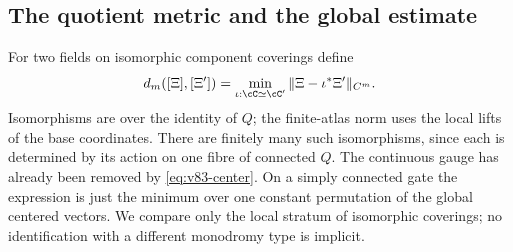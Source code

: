 \subsection{The quotient metric and the global estimate}
For two fields on isomorphic component coverings define
\begin{equation}\label{eq:v83-quotient-metric}
 d_m([\Xi],[\Xi'])=
       \min_{\iota:\cC\simeq\cC'}\|\Xi-\iota^*\Xi'\|_{C^m}.
\end{equation}
Isomorphisms are over the identity of $Q$; the finite-atlas norm uses
the local lifts of the base coordinates. There are finitely many such
isomorphisms, since each is determined by its action on one fibre of
connected $Q$. The continuous gauge has already been removed by
\eqref{eq:v83-center}. On a simply connected gate the expression is
just the minimum over one constant permutation of the global centered
vectors. We compare only the local stratum of isomorphic coverings;
no identification with a different monodromy type is implicit.

